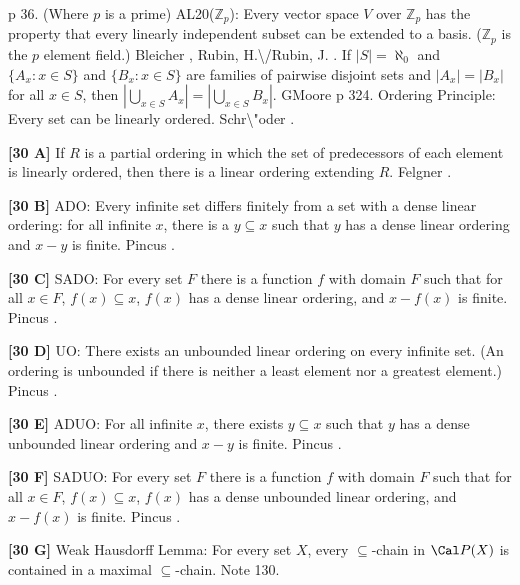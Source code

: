 \cite{1982} p 36.
\medskip
{} (Where $p$ is a prime) AL20($\mathbb Z_p$):
Every vector space $V$ over $\mathbb Z_p$ has the property that every
linearly independent subset can be extended to a basis.  ($\mathbb Z_p$ is
the $p$ element field.) \ac{Bleicher} \cite{1964}, \ac{Rubin, H.\/Rubin,
J.} \cite{1985, p.119, AL20}.
\medskip
{} If $|S| = \aleph_{0}$ and $\{A_{x}: x\in S\}$ and
$\{B_{x}: x\in S\}$ are families of pairwise disjoint sets and $|A_{x}|
= |B_{x}|$ for all $x\in S$, then $|\bigcup^{}_{x\in S} A_{x}| =
|\bigcup^{}_{x\in S} B_{x}|$. G\. \ac{Moore} \cite{1982} p 324.
\medskip
{} Ordering Principle: Every set can be linearly
ordered.  \ac{Schr\"oder} \cite{1988}. 
\smallskip
\item{}{\bf [30 A]} If $R$ is a partial ordering in which the set of
predecessors of each element is linearly ordered, then there is
a linear ordering extending $R$.  \ac{Felgner} \cite{1969}.
\smallskip
\item{}{\bf [30 B]} ADO: Every infinite set differs finitely from a set
with a dense linear ordering: for all infinite $x$, there is a $y\subseteq
x$ such that $y$ has a dense linear ordering and $x-y$ is finite.
\ac{Pincus} \cite{1997}.
\smallskip
\item{}{\bf [30 C]} SADO: For every set $F$ there is a function $f$ with
domain $F$ such that for all $x\in F$, $f(x)\subseteq x$, $f(x)$ has
a dense linear ordering,  and $x - f(x)$ is finite. \ac{Pincus}
\cite{1997}.
\smallskip
\item{}{\bf [30 D]} UO: There exists an unbounded linear ordering
on every infinite set. (An ordering is unbounded if there is neither
a least element nor a greatest element.) \ac{Pincus} \cite{1997}.
\smallskip
\item{}{\bf [30 E]} ADUO: For all infinite $x$, there exists $y\subseteq
x$ such that $y$ has a dense unbounded linear ordering and $x - y$ is
finite. \ac{Pincus} \cite{1997}.
\smallskip
\item{}{\bf [30 F]} SADUO: For every set $F$ there is a function $f$ with
domain $F$ such that for all $x\in F$, $f(x)\subseteq x$, $f(x)$ has
a dense unbounded linear ordering, and $x - f(x)$ is finite. \ac{Pincus}
\cite{1997}.
\smallskip
\item{}{\bf [30 G]} Weak Hausdorff Lemma:  For every set $X$, every
$\subseteq$-chain in $\Cal P(X)$ is contained in a maximal
$\subseteq$-chain.  Note 130. 
